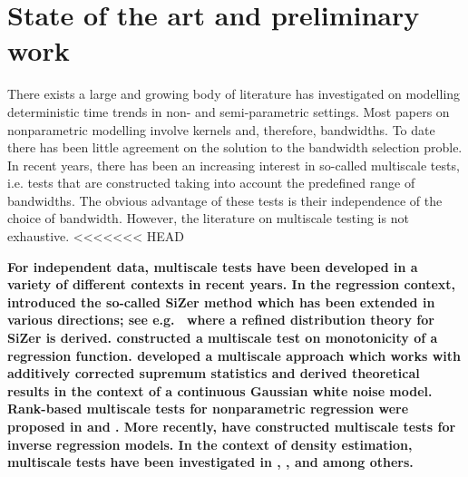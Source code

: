 \documentclass[a4paper,12pt]{article}
\begin{document}



\section{State of the art and preliminary work}

There exists a large and growing body of literature has investigated on modelling deterministic time trends in non- and semi-parametric settings. Most papers on nonparametric modelling involve kernels and, therefore, bandwidths. To date there has been little agreement on the solution to the bandwidth selection proble. In recent years, there has been an increasing interest in so-called multiscale tests, i.e. tests that are constructed  taking into account the predefined range of bandwidths. The obvious advantage of these tests is their independence of the choice of bandwidth. However, the literature on multiscale testing is not exhaustive.
<<<<<<< HEAD

{\bf For independent data, multiscale tests have been developed in a variety of different contexts in recent years. In the regression context, \cite{ChaudhuriMarron1999,ChaudhuriMarron2000} introduced the so-called SiZer method which has been extended in various directions; see e.g.\ \cite{HannigMarron2006} where a refined distribution theory for SiZer is derived. \cite{HallHeckman2000} constructed a multiscale test on monotonicity of a regression function. \cite{DuembgenSpokoiny2001} developed a multiscale approach which works with additively corrected supremum statistics and derived theoretical results in the context of a continuous Gaussian white noise model. Rank-based multiscale tests for nonparametric regression were proposed in \cite{Duembgen2002} and \cite{Rohde2008}. More recently, \cite{ProkschWernerMunk2018} have constructed multiscale tests for inverse regression models. In the context of density estimation, multiscale tests have been investigated in \cite{DuembgenWalther2008}, \cite{RufibachWalther2010}, \cite{SchmidtHieber2013} and \cite{EckleBissantzDette2017} among others.}
\end{document}
